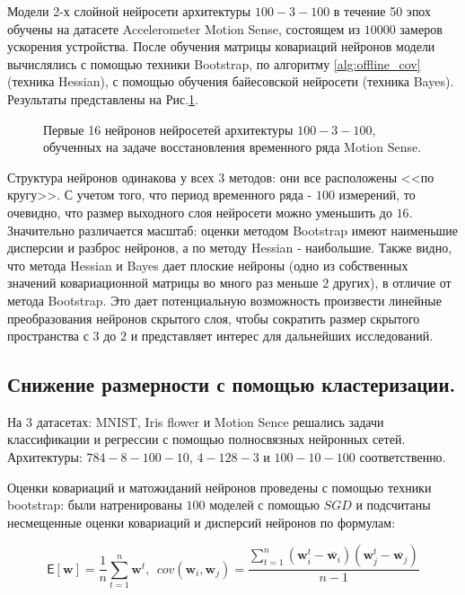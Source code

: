 \documentclass[12pt, twoside]{article}
\begin{document}
 Модели 2-х слойной нейросети архитектуры $100-3-100$ в течение 50 эпох обучены на датасете Accelerometer Motion Sense, состоящем из $10000$ замеров ускорения устройства. После обучения матрицы ковариаций нейронов модели вычислялись с помощью техники Bootstrap, по алгоритму \ref{alg:offline_cov} (техника Hessian), с помощью обучения байесовской нейросети (техника Bayes). Результаты представлены на Рис.\ref{fg:neurons_3_methods}.


\begin{figure}[!ht]
\caption{Первые 16 нейронов нейросетей архитектуры $100-3-100$, обученных на задаче восстановления временного ряда Motion Sense.}
\label{fg:neurons_3_methods}
\end{figure}

Структура нейронов одинакова у всех $3$ методов: они все расположены <<по кругу>>. С учетом того, что период временного ряда - $100$ измерений, то очевидно, что размер выходного слоя нейросети можно уменьшить до $16$. Значительно различается масштаб: оценки методом Bootstrap имеют наименьшие дисперсии и разброс нейронов, а по методу Hessian - наибольшие. Также видно, что метода Hessian и Bayes дает плоские нейроны (одно из собственных значений ковариационной матрицы во много раз меньше $2$ других), в отличие от метода Bootstrap. Это дает потенциальную возможность произвести линейные преобразования нейронов скрытого слоя, чтобы сократить размер скрытого пространства с $3$ до $2$ и представляет интерес для дальнейших исследований.


\subsection{Снижение размерности с помощью кластеризации.}
На 3 датасетах: MNIST, Iris flower и Motion Sence решались задачи классификации и регрессии с помощью полносвязных нейронных сетей. Архитектуры: $784-8-100-10$, $4-128-3$ и $100-10-100$ соответственно. 

Оценки ковариаций и матожиданий нейронов проведены с помощью техники bootstrap: были натренированы $100$ моделей с помощью $SGD$ и подсчитаны несмещенные оценки ковариаций и дисперсий нейронов по формулам:

$$
\mathsf{E}[\mathbf{w}] = \frac{1}{n}\sum\limits_{t=1}^n\mathbf{w}^t, \ \ 
cov(\mathbf{w}_i, \mathbf{w}_j) = \frac{\sum\limits_{t=1}^n(\mathbf{w}_i^t - \overline{\mathbf{w}_i})(\mathbf{w}_j^t - \overline{\mathbf{w}_j})}{n-1}
$$
\end{document}
